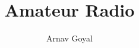
\lstset{
	language=Verilog
}

\title{Amateur Radio}
\author{Arnav Goyal}

\def\myreferences{
	\item HAMSTUDY
}


	\frontmatter
	\maketitle
	\preface
	
	\mainmatter
	
	
